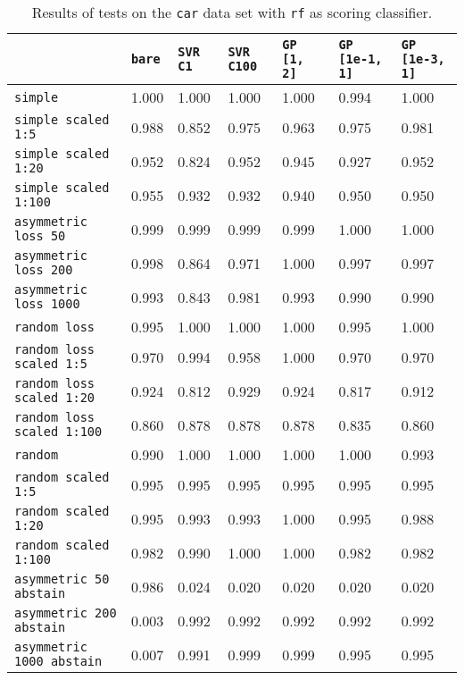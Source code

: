 \begin{table}[H]
{\scriptsize
\begin{tabu}{l|l|l|l|l|l|l}
&\texttt{bare} &\texttt{SVR C1} &\texttt{SVR C100} &\texttt{GP [1, 2]} &\texttt{GP [1e-1, 1]} &\texttt{GP [1e-3, 1]}  \\
\hline
\texttt{simple} &1.000 &1.000 &1.000 &1.000 &0.994 &1.000 \\
\texttt{simple scaled 1:5} &0.988 &0.852 &0.975 &0.963 &0.975 &0.981 \\
\texttt{simple scaled 1:20} &0.952 &0.824 &0.952 &0.945 &0.927 &0.952 \\
\texttt{simple scaled 1:100} &0.955 &0.932 &0.932 &0.940 &0.950 &0.950 \\
\texttt{asymmetric loss 50} &0.999 &0.999 &0.999 &0.999 &1.000 &1.000 \\
\texttt{asymmetric loss 200} &0.998 &0.864 &0.971 &1.000 &0.997 &0.997 \\
\texttt{asymmetric loss 1000} &0.993 &0.843 &0.981 &0.993 &0.990 &0.990 \\
\texttt{random loss} &0.995 &1.000 &1.000 &1.000 &0.995 &1.000 \\
\texttt{random loss scaled 1:5} &0.970 &0.994 &0.958 &1.000 &0.970 &0.970 \\
\texttt{random loss scaled 1:20} &0.924 &0.812 &0.929 &0.924 &0.817 &0.912 \\
\texttt{random loss scaled 1:100} &0.860 &0.878 &0.878 &0.878 &0.835 &0.860 \\
\texttt{random} &0.990 &1.000 &1.000 &1.000 &1.000 &0.993 \\
\texttt{random scaled 1:5} &0.995 &0.995 &0.995 &0.995 &0.995 &0.995 \\
\texttt{random scaled 1:20} &0.995 &0.993 &0.993 &1.000 &0.995 &0.988 \\
\texttt{random scaled 1:100} &0.982 &0.990 &1.000 &1.000 &0.982 &0.982 \\
\texttt{asymmetric 50 abstain} &0.986 &0.024 &0.020 &0.020 &0.020 &0.020 \\
\texttt{asymmetric 200 abstain} &0.003 &0.992 &0.992 &0.992 &0.992 &0.992 \\
\texttt{asymmetric 1000 abstain} &0.007 &0.991 &0.999 &0.999 &0.995 &0.995 \\
\end{tabu} }
\caption{Results of tests on the \texttt{car} data set
         with \texttt{rf} as scoring classifier.}
\end{table}

